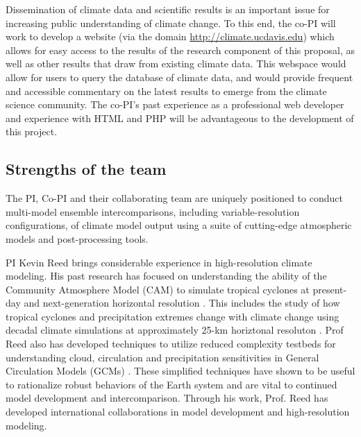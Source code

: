 \documentclass[11pt]{article}
\begin{document}
Dissemination of climate data and scientific results is an important issue for increasing public understanding of climate change.  To this end, the co-PI will work to develop a website (via the domain \url{http://climate.ucdavis.edu}) which allows for easy access to the results of the research component of this proposal, as well as other results that draw from existing climate data.  This webspace would allow for users to query the database of climate data, and would provide frequent and accessible commentary on the latest results to emerge from the climate science community.  The co-PI's past experience as a professional web developer and experience with HTML and PHP will be advantageous to the development of this project.

\subsection{Strengths of the team}\label{sec:strengths}

The PI, Co-PI and their collaborating team are uniquely positioned to conduct multi-model ensemble intercomparisons, including variable-resolution configurations, of climate model output using a suite of cutting-edge atmospheric models and post-processing tools.

PI Kevin Reed brings considerable experience in high-resolution climate modeling.  His past research has focused on understanding the ability of the Community Atmosphere Model (CAM) to simulate tropical cyclones at present-day and next-generation horizontal resolution \citep{Reed2011a,Reed2011c,Reed2012b}.  This includes the study of how tropical cyclones and precipitation extremes change with climate change using decadal climate simulations at approximately 25-km horiztonal resoluton \citep{Wehner2014,Villarini2014,Wehner2015,Reed2015b}. Prof Reed also has developed techniques to utilize reduced complexity testbeds for understanding cloud, circulation and precipitation sensitivities in General Circulation Models (GCMs) \citep{Reed2012a,Reed2015a}. These simplified techniques have shown to be useful to rationalize robust behaviors of the Earth system and are vital to continued model development and intercomparison. Through his work, Prof. Reed has developed international collaborations in model development and high-resolution modeling.
\end{document}
